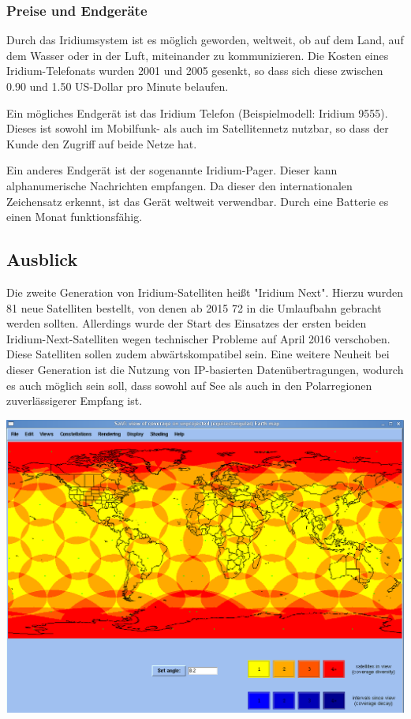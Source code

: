 \begin{multicols}{3}

\subsubsection*{Preise und Endgeräte}
Durch das Iridiumsystem ist es möglich geworden, weltweit, ob auf dem Land, auf dem Wasser oder in der Luft, miteinander zu kommunizieren. Die Kosten eines Iridium-Telefonats wurden 2001 und 2005 gesenkt, so dass sich diese zwischen 0.90 und 1.50 US-Dollar pro Minute belaufen.

Ein mögliches Endgerät ist das Iridium Telefon (Beispielmodell: Iridium 9555). Dieses ist sowohl im Mobilfunk- als auch im Satellitennetz nutzbar, so dass der Kunde den Zugriff auf beide Netze hat.

Ein anderes Endgerät ist der sogenannte Iridium-Pager. Dieser kann alphanumerische Nachrichten empfangen. Da dieser den internationalen Zeichensatz erkennt, ist das Gerät weltweit verwendbar. Durch eine Batterie es einen Monat funktionsfähig.~\cite{I1, I4}

\subsection*{Ausblick}
Die zweite Generation von Iridium-Satelliten heißt "Iridium Next". Hierzu wurden 81 neue Satelliten bestellt, von denen ab 2015 72 in die Umlaufbahn gebracht werden sollten.  Allerdings wurde der Start des Einsatzes der ersten beiden Iridium-Next-Satelliten wegen technischer Probleme auf April 2016 verschoben. Diese Satelliten sollen zudem abwärtskompatibel sein. Eine weitere Neuheit bei dieser Generation ist die Nutzung von IP-basierten Datenübertragungen, wodurch es auch möglich sein soll, dass sowohl auf See als auch in den Polarregionen zuverlässigerer Empfang ist.~\cite{I2, I7}


\printbibliography[segment=13,heading=subbibliography]
\end{multicols}
\begin{Figure}
	\includegraphics[width=\linewidth, height= 7.6 cm]{Kapitel/Iridium/Grafiken/netzabdeckung82.png}
	\label{na8.2}
\end{Figure}

\newpage
